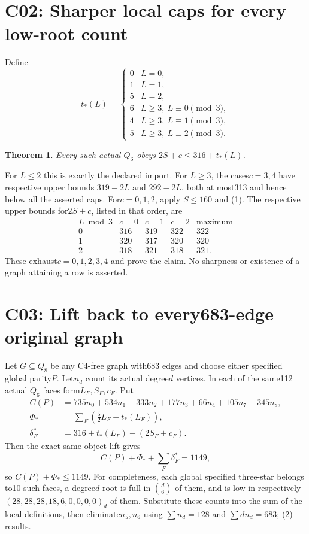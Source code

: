 \documentclass{article}
\newtheorem{theorem}{Theorem}
\begin{document}
\section{C02: Sharper local caps for every low-root count}
Define
\[
 t_*(L)=\begin{cases}
 0&L=0,\\1&L=1,\\5&L=2,\\
 6&L\ge3,\ L\equiv0\pmod3,\\
 4&L\ge3,\ L\equiv1\pmod3,\\
 5&L\ge3,\ L\equiv2\pmod3.
 \end{cases}
\]
\begin{theorem}
Every such actual $Q_6$ obeys $2S+c\le316+t_*(L)$.
\end{theorem}
For $L\le2$ this is exactly the declared import. For $L\ge3$, the
cases$c=3,4$ have respective upper bounds $319-2L$ and $292-2L$,
both at most313 and hence below all the asserted caps. For$c=0,1,2$,
apply $S\le160$ and (1). The respective upper bounds for$2S+c$,
listed in that order, are
\[
\begin{array}{c|ccc|c}
L\bmod3&c=0&c=1&c=2&\text{maximum}\\\hline
0&316&319&322&322\\
1&320&317&320&320\\
2&318&321&318&321.
\end{array}
\]
These exhaust$c=0,1,2,3,4$ and prove the claim. No sharpness or
existence of a graph attaining a row is asserted.

\section{C03: Lift back to every683-edge original graph}
Let $G\subseteq Q_8$ be any C4-free graph with683 edges and choose
either specified global parity$P$. Let$n_d$ count its actual degree$d$
vertices. In each of the same112 actual $Q_6$ faces form$L_F,S_F,c_F$.
Put
\[
\begin{split}
 C(P)&=735n_0+534n_1+333n_2+177n_3+66n_4+105n_7+345n_8,\\
 \Phi_*&=\sum_F\left(\frac52 L_F-t_*(L_F)\right),\\
 \delta_F^*&=316+t_*(L_F)-(2S_F+c_F).
\end{split}
\]
Then the exact same-object lift gives
\[
             C(P)+\Phi_*+\sum_F\delta_F^*=1149,          \tag{2}
\]
so $C(P)+\Phi_*\le1149$. For completeness, each global specified
three-star belongs to10 such faces, a degree$d$ root is full in
$\binom d6$ of them, and is low in respectively
$(28,28,28,18,6,0,0,0,0)_d$ of them. Substitute these counts into
the sum of the local definitions, then eliminate$n_5,n_6$ using
$\sum n_d=128$ and $\sum dn_d=683$; (2) results.
\end{document}
